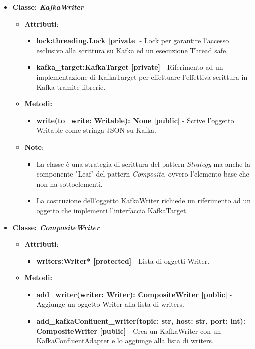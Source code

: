 \begin{itemize}
\begin{itemize}
    \end{itemize}
    \item{\textbf{Classe: \textit{KafkaWriter}}}
    \begin{itemize}
    \item\textbf{Attributi}:
        \begin{itemize}
        \item \textbf{lock:threading.Lock [private]} - Lock per garantire l'accesso esclusivo alla scrittura su Kafka ed un esecuzione Thread safe.
        \item \textbf{kafka\_target:KafkaTarget [private]} - Riferimento ad un implementazione di KafkaTarget per effettuare l'effettiva scrittura in Kafka tramite librerie.
    \end{itemize}
    \item \textbf{Metodi: }
    \begin{itemize}
        \item \textbf{write(to\_write: Writable): None [public]} - Scrive l'oggetto Writable come stringa JSON su Kafka.
    \end{itemize}
    \item\textbf{Note}:
        \begin{itemize}
            \item La classe è una strategia di scrittura del pattern \textit{Strategy} ma anche la componente "Leaf" del pattern \textit{Composite}, ovvero l'elemento base che non ha sottoelementi.
            \item La costruzione dell'oggetto KafkaWriter richiede un riferimento ad un oggetto che implementi l'interfaccia KafkaTarget.
        \end{itemize}
    \end{itemize}
    \item{\textbf{Classe: \textit{CompositeWriter}}}
    \begin{itemize}
    \item\textbf{Attributi}:
        \begin{itemize}
        \item \textbf{writers:Writer* [protected]} - Lista di oggetti Writer.
    \end{itemize}
    \item \textbf{Metodi: }
    \begin{itemize}
        \item \textbf{add\_writer(writer: Writer): CompositeWriter [public]} - Aggiunge un oggetto Writer alla lista di writers.
        \item \textbf{add\_kafkaConfluent\_writer(topic: str, host: str, port: int): CompositeWriter [public]} - Crea un KafkaWriter con un KafkaConfluentAdapter e lo aggiunge alla lista di writers.

\end{itemize}
\end{itemize}
\end{itemize}
